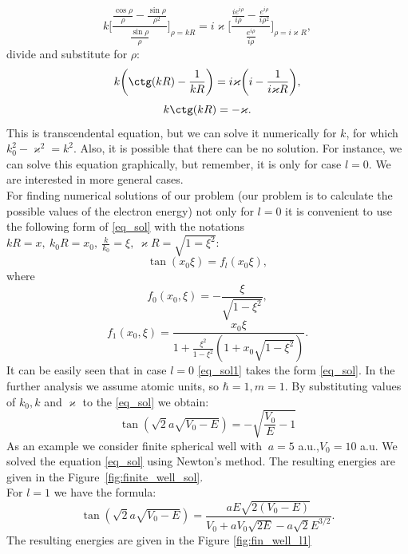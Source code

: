 \documentclass[a4paper, 14pt]{article}
\begin{document}
$$k \bigg[ \frac{\frac{\cos \rho}{\rho} - \frac{\sin \rho}{\rho^2}}{\frac{\sin \rho}{\rho}} \bigg]_{\rho = kR} = i \varkappa \bigg[ \frac{\frac{i e^{i \rho}}{i \rho} - \frac{e^{i \rho}}{i \rho^2}}{\frac{e^{i \rho}}{i \rho}} \bigg]_{\rho = i \varkappa R},
$$
divide and substitute for  $\rho$:
$$k \bigg(\ctg(kR)-\frac{1}{kR}\bigg) = i \varkappa \bigg( i - \frac{1}{i \varkappa R} \bigg),$$
\begin{equation}\label{eq_sol}
	k \ctg(kR) = - \varkappa.
\end{equation}
This is transcendental equation, but we can solve it numerically for  $k$,  for which $k_0^2-\varkappa^2=k^2.$ Also, it is possible that there can be no solution. For instance, we can solve this equation graphically, but remember, it is only for case $l=0.$ We are interested in more general cases.\\
For finding numerical solutions of our problem (our problem is to calculate the possible values of the electron energy) not only for $l=0$ it is convenient to use the following form of \eqref{eq_sol} with the notations $kR = x, ~k_0 R=x_0, ~\frac{k}{k_0} = \xi, ~\varkappa R = \sqrt{1=\xi^2}$:
\begin{equation}\label{eq_sol1}
	\tan(x_0 \xi) = f_l(x_0 \xi),
\end{equation}
where
$$f_0(x_0, \xi) = -\frac{\xi}{\sqrt{1-\xi^2}},$$
$$f_1(x_0, \xi) = \frac{x_0 \xi}{1+\frac{\xi^2}{1-\xi^2}(1+x_0 \sqrt{1-\xi^2})}.$$ 
It can be easily seen that in case $l=0$ \eqref{eq_sol1} takes the form \eqref{eq_sol}. In the further analysis we assume atomic units, so $\hbar = 1, m=1.$ By substituting values of $k_0, k$ and $\varkappa$ to the \eqref{eq_sol} we obtain:
$$\tan(\sqrt{2} a \sqrt{V_0-E})=-\sqrt{\frac{V_0}{E}-1}$$ 
As an example we consider finite spherical well with $\ a = 5 $ a.u.,$ V_0 = 10$ a.u. We solved the equation \eqref{eq_sol} using Newton's method. The resulting energies are given in the Figure~\ref{fig:finite_well_sol}.\\
For $l=1$ we have the formula:
$$\tan(\sqrt{2} a \sqrt{V_0-E}) = \frac{a E \sqrt{2(V_0 - E)}}{V_0+a V_0 \sqrt{2E} -a \sqrt{2} E^{3/2}}.$$
The resulting energies are given in the Figure \ref{fig:fin_well_l1}
\pagebreak
\end{document}
